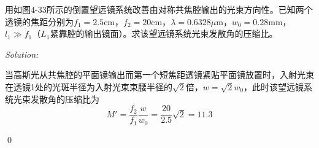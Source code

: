 \documentclass[12pt,a4paper]{article}
\newenvironment{problem}[2][Problem]{\begin{trivlist}
\item[\hskip \labelsep {\bfseries #1}\hskip \labelsep {\bfseries #2.}]}{\end{trivlist}}
\newenvironment{sol}
    {\emph{Solution:}
    }
    {
    \qed
    }
\begin{document}
\begin{problem}{4.5}
用如图4-33所示的倒置望远镜系统改善由对称共焦腔输出的光束方向性。已知两个透镜的焦距分别为$f_1=2.5$cm，$f_2=20$cm，$\lambda=0.6328\mu$m，$w_0=0.28$mm，$l_1\gg f_1$（$L_1$紧靠腔的输出镜面）。求该望远镜系统光束发散角的压缩比。
\end{problem}
\begin{sol}
当高斯光从共焦腔的平面镜输出而第一个短焦距透镜紧贴平面镜放置时，入射光束在透镜1处的光斑半径为入射光束束腰半径的$\sqrt{2}$倍，$w=\sqrt{2}w_0$，此时该望远镜系统光束发散角的压缩比为
\begin{equation}
M'=\frac{f_2}{f_1}\frac{w}{w_0}=\frac{20}{2.5}\sqrt{2}=11.3
\end{equation}
\end{sol}
\end{document}
